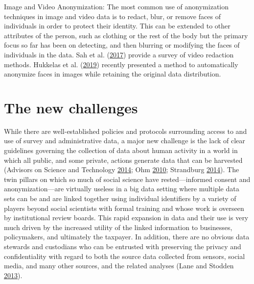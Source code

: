 \documentclass[]{krantz}
\begin{document}
Image and Video Anonymization: The most common use of anonymization
techniques in image and video data is to redact, blur, or remove faces
of individuals in order to protect their identity. This can be extended
to other attributes of the person, such as clothing or the rest of the
body but the primary focus so far has been on detecting, and then
blurring or modifying the faces of individuals in the data. Sah et al.
(\protect\hyperlink{ref-Sah2017}{2017}) provide a survey of video
redaction methods. Hukkelas et al.
(\protect\hyperlink{ref-Hukkelas2019}{2019}) recently presented a method
to automatically anonymize faces in images while retaining the original
data distribution.

\section{The new challenges}\label{the-new-challenges}

While there are well-established policies and protocols surrounding
access to and use of survey and administrative data, a major new
challenge is the lack of clear guidelines governing the collection of
data about human activity in a world in which all public, and some
private, actions generate data that can be harvested (Advisors on
Science and Technology \protect\hyperlink{ref-house2014big}{2014}; Ohm
\protect\hyperlink{ref-ohm2010broken}{2010}; Strandburg
\protect\hyperlink{ref-Strandburg2014}{2014}). The twin pillars on which
so much of social science have rested---informed consent and
anonymization---are virtually useless in a big data setting where
multiple data sets can be and are linked together using individual
identifiers by a variety of players beyond social scientists with formal
training and whose work is overseen by institutional review boards. This
rapid expansion in data and their use is very much driven by the
increased utility of the linked information to businesses, policymakers,
and ultimately the taxpayer. In addition, there are no obvious data
stewards and custodians who can be entrusted with preserving the privacy
and confidentiality with regard to both the source data collected from
sensors, social media, and many other sources, and the related analyses
(Lane and Stodden \protect\hyperlink{ref-lane2013me}{2013}).
\end{document}
